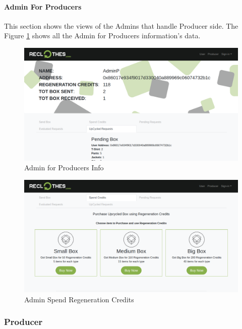 \paragraph{Admin For Producers}

This section shows the views of the Admins that handle Producer side. The Figure \ref{fig:adminp-info} 
shows all the Admin for Producers information's data. 

\begin{figure}[h!]
    \centering
    \includegraphics[totalheight=7.5cm]{img/dapp/adminp-info.png}
    \caption{Admin for Producers Info}
    \label{fig:adminp-info}
\end{figure}

\begin{figure}[h!]
    \centering
    \includegraphics[totalheight=7.5cm]{img/dapp/adminp-buy.png}
    \caption{Admin Spend Regeneration Credits}
    \label{fig:adminp-buy}
\end{figure}

\newpage
\subsubsection{Producer}

